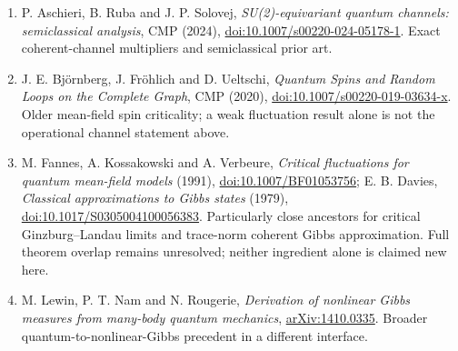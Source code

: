 \documentclass[11pt]{article}
\begin{document}
\begin{enumerate}
\item P. Aschieri, B. Ruba and J. P. Solovej, \emph{SU(2)-equivariant quantum channels: semiclassical analysis}, CMP (2024), \href{https://doi.org/10.1007/s00220-024-05178-1}{doi:10.1007/s00220-024-05178-1}. Exact coherent-channel multipliers and semiclassical prior art.
\item J. E. Bj\"ornberg, J. Fr\"ohlich and D. Ueltschi, \emph{Quantum Spins and Random Loops on the Complete Graph}, CMP (2020), \href{https://doi.org/10.1007/s00220-019-03634-x}{doi:10.1007/s00220-019-03634-x}. Older mean-field spin criticality; a weak fluctuation result alone is not the operational channel statement above.
\item M. Fannes, A. Kossakowski and A. Verbeure, \emph{Critical fluctuations for quantum mean-field models} (1991), \href{https://doi.org/10.1007/BF01053756}{doi:10.1007/BF01053756}; E. B. Davies, \emph{Classical approximations to Gibbs states} (1979), \href{https://doi.org/10.1017/S0305004100056383}{doi:10.1017/S0305004100056383}. Particularly close ancestors for critical Ginzburg--Landau limits and trace-norm coherent Gibbs approximation. Full theorem overlap remains unresolved; neither ingredient alone is claimed new here.
\item M. Lewin, P. T. Nam and N. Rougerie, \emph{Derivation of nonlinear Gibbs measures from many-body quantum mechanics}, \href{https://arxiv.org/abs/1410.0335}{arXiv:1410.0335}. Broader quantum-to-nonlinear-Gibbs precedent in a different interface.
\end{enumerate}
\end{document}

